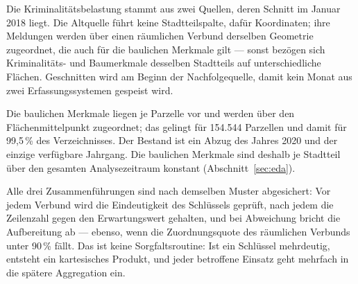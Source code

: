 \documentclass[12pt,a4paper]{article}
\begin{document}
Die Kriminalitätsbelastung stammt aus zwei Quellen, deren Schnitt im Januar
2018 liegt. Die Altquelle führt keine Stadtteilspalte, dafür Koordinaten; ihre
Meldungen werden über einen räumlichen Verbund derselben Geometrie zugeordnet,
die auch für die baulichen Merkmale gilt --- sonst bezögen sich Kriminalitäts-
und Baumerkmale desselben Stadtteils auf unterschiedliche Flächen.
Geschnitten wird am Beginn der
Nachfolgequelle, damit kein Monat aus zwei Erfassungssystemen gespeist wird.
 
Die baulichen Merkmale liegen je Parzelle vor und werden über den
Flächenmittelpunkt zugeordnet; das gelingt für 154.544 Parzellen und damit für
99,5\,\% des Verzeichnisses. Der Bestand ist ein Abzug des Jahres 2020 und der
einzige verfügbare Jahrgang. Die baulichen Merkmale sind deshalb je Stadtteil
über den gesamten Analysezeitraum konstant (Abschnitt~\ref{sec:eda}).
 
Alle drei Zusammenführungen sind nach demselben Muster abgesichert: Vor jedem
Verbund wird die Eindeutigkeit des Schlüssels geprüft, nach jedem die Zeilenzahl
gegen den Erwartungswert gehalten, und bei Abweichung bricht die Aufbereitung
ab --- ebenso, wenn die Zuordnungsquote des
räumlichen Verbunds unter 90\,\% fällt. Das ist keine Sorgfaltsroutine: Ist ein
Schlüssel mehrdeutig, entsteht ein kartesisches Produkt, und jeder betroffene
Einsatz geht mehrfach in die spätere Aggregation ein.

\end{document}
